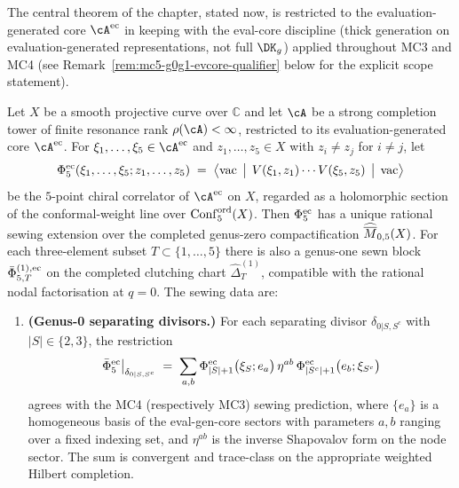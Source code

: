 The central theorem of the chapter, stated now, is restricted to the
evaluation-generated core $\cA^{\evcore}$ in keeping with the
eval-core discipline (thick generation on evaluation-generated
representations, not full $\DK_g$) applied throughout MC3 and MC4
\textup{(}see Remark~\ref{rem:mc5-g0g1-evcore-qualifier} below for the
explicit scope statement\textup{)}.

\begin{theorem}
\label{thm:mc5-g0g1-wall-five-point-sewing}
Let $X$ be a smooth projective curve over $\mathbb{C}$ and let $\cA$ be a
strong completion tower of finite resonance rank $\rho(\cA) < \infty$,
restricted to its evaluation-generated core $\cA^{\evcore}$.
For $\xi_{1}, \dots, \xi_{5} \in \cA^{\evcore}$ and $z_{1}, \dots, z_{5}
\in X$ with $z_{i} \neq z_{j}$ for $i \neq j$, let
\[
\Phi^{\mathrm{ec}}_{5}(\xi_{1}, \dots, \xi_{5}; z_{1}, \dots, z_{5})
\;=\;
\bigl\langle \mathrm{vac} \,\bigm|\, V(\xi_{1}, z_{1}) \cdots V(\xi_{5}, z_{5}) \,\bigm|\, \mathrm{vac}\bigr\rangle
\]
be the $5$-point chiral correlator of $\cA^{\evcore}$ on $X$, regarded
as a holomorphic section of the conformal-weight line over
$\mathrm{Conf}^{\mathrm{ord}}_{5}(X)$. Then $\Phi^{\mathrm{ec}}_{5}$ has a unique rational
sewing extension over the completed genus-zero compactification
$\widehat{\overline{M}}_{0,5}(X)$. For each three-element subset
$T\subset\{1,\ldots,5\}$ there is also a genus-one sewn block
$\bar\Phi^{(1),\mathrm{ec}}_{5,T}$ on the completed clutching chart
$\widehat{\Delta}^{(1)}_{T}$, compatible with the rational nodal
factorisation at $q=0$. The sewing data are:
\begin{enumerate}[label=\textup{(\roman*)}]
\item \textbf{(Genus-0 separating divisors.)} For each separating divisor
$\delta_{0|S, S^c}$ with $|S| \in \{2, 3\}$, the restriction
\begin{equation}
\label{eq:mc5-g0g1-restriction-separating}
\bar\Phi^{\mathrm{ec}}_{5}\big|_{\delta_{0|S, S^c}}
\;=\;
\sum_{a, b}
\Phi^{\mathrm{ec}}_{|S|+1}\bigl(\xi_{S}; e_{a}\bigr) \,
\eta^{ab} \,
\Phi^{\mathrm{ec}}_{|S^c|+1}\bigl(e_{b}; \xi_{S^c}\bigr)
\end{equation}
agrees with the MC4 \textup{(}respectively MC3\textup{)} sewing
prediction, where $\{e_{a}\}$ is a homogeneous basis of the
eval-gen-core sectors with parameters $a, b$ ranging over a fixed
indexing set, and $\eta^{ab}$ is the inverse Shapovalov form on the node
sector. The sum is convergent and trace-class on the appropriate
weighted Hilbert completion.


\end{enumerate}
\end{theorem}
